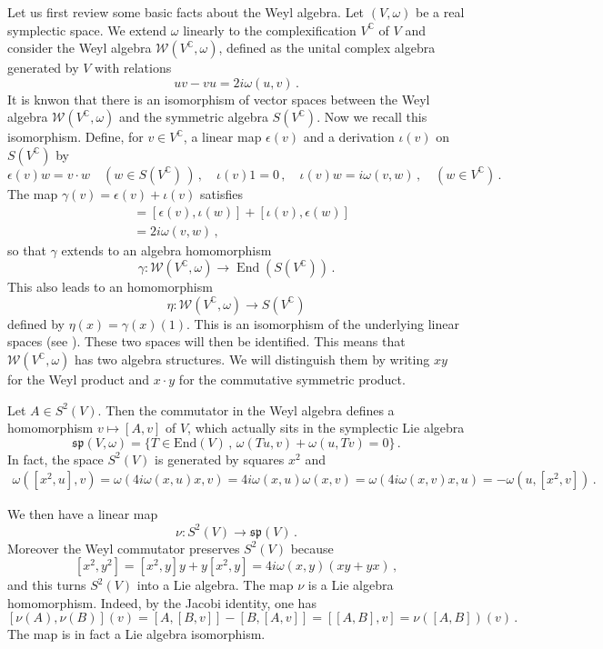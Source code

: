 \documentclass{amsart}[draft,11pt]
\numberwithin{equation}{section}
\theoremstyle{definition}
\begin{document}
Let us first review some basic facts about the Weyl algebra. Let $(V,\omega)$ be a real symplectic space. We extend $\omega$ linearly to the complexification $V^\mathbb{C}$ of $V$ and consider the Weyl algebra 
$\mathcal{W}(V^\mathbb{C},\omega)$,
defined as the unital complex algebra generated by $V$
with relations 
$$ uv-vu= 2i\omega(u,v)\,.$$
It is knwon that there is an isomorphism of vector spaces between the Weyl algebra $\mathcal{W}(V^\mathbb{C},\omega)$ and the symmetric algebra $S(V^\mathbb{C})$. Now we recall this isomorphism. Define, for $v\in V^\mathbb{C}$, a linear map
$\epsilon (v)$ and a derivation $\iota(v)$ on $S(V^\mathbb{C})$ by
$$ \epsilon (v) w = v\cdot w \quad (w\in S(V^\mathbb{C})\,)
\,,\quad \iota (v) 1=0\,,\quad \iota (v) w = i\omega (v,w)\,,\quad (w\in V^\mathbb{C})\,.$$
The map $\gamma (v) =  \epsilon (v) + \iota (v)$
satisfies
\begin{align*}
    [\gamma (v) , \gamma (w)]
    &= [\epsilon (v), \iota (w)] +
    [\iota (v), \epsilon (w)] \\
     &= 2i\omega(v,w)\,,
\end{align*}
so that $\gamma$ extends to an algebra
homomorphism 
$$ 
\gamma \colon 
\mathcal{W}(V^\mathbb{C},\omega) \to 
\mathop{End} 
(S(V^\mathbb{C}))\,.
$$
This also leads to an homomorphism 
$$ \eta \colon \mathcal{W}(V^\mathbb{C},\omega)
\to S(V^\mathbb{C})
$$
defined by $\eta(x)=\gamma(x)(1)$. This is an isomorphism of the underlying linear spaces (see \cite{kostant2001}). These two spaces will then 
be identified. This means that $\mathcal{W}(V^\mathbb{C},\omega)$ has two algebra structures. We will distinguish them by writing $xy$ for the Weyl product and $x\cdot y$ for the commutative symmetric product.

Let $A\in S^2(V)$. Then the commutator in the Weyl algebra defines a homomorphism $v\mapsto [A,v]$ of $V$, which actually sits in the symplectic Lie algebra 
$$ \mathfrak{sp}(V,\omega) = \{ T \in \mathrm{End}(V)\,,\, \omega(Tu,v)+\omega(u,Tv)=0\}\,.$$
In fact, the space $S^2(V)$ is generated by squares $x^2$ and 
\begin{align*}
\omega ([x^2,u],v)
= 
\omega(4i\omega(x,u)x,v)
=
4i\omega(x,u)\omega(x,v)
=
\omega(4i\omega(x,v)x,u)
=
-\omega(u,[x^2,v])\,.
\end{align*}

We then have a linear map
\begin{equation} 
\nu \colon S^2(V) \to \mathfrak{sp}(V)\,.
\label{def_nu}
\end{equation}
Moreover the Weyl commutator preserves $S^2(V)$ because 
$$ [x^2,y^2]= [x^2,y]y + y[x^2,y]
= 4i\omega(x,y)(xy+yx)\,,
$$
and this turns $S^2(V)$ into a Lie algebra.
The map $\nu$ is a Lie algebra homomorphism. Indeed, by the Jacobi identity, one has
$$ 
[\nu(A),\nu(B)](v)= 
[A,[B,v]]-[B,[A,v]] = [[A,B],v]=\nu([A,B])(v)\,.
$$
The map is in fact a Lie algebra isomorphism.
\end{document}

